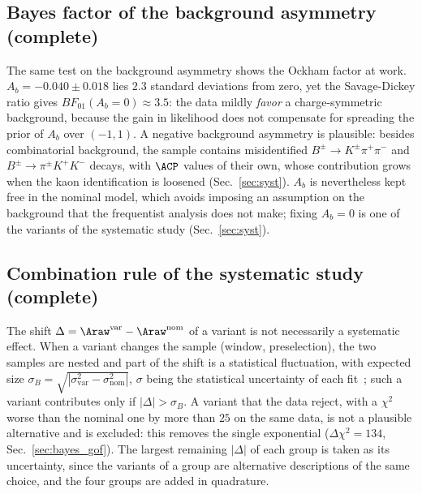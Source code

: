 \subsection{Bayes factor of the background asymmetry (complete)}
The same test on the background asymmetry shows the Ockham factor at work. $A_b=-0.040\pm0.018$ lies $2.3$ standard deviations from zero, yet the Savage-Dickey ratio gives $BF_{01}(A_b=0)\approx3.5$: the data mildly \emph{favor} a charge-symmetric background, because the gain in likelihood does not compensate for spreading the prior of $A_b$ over $(-1,1)$. A negative background asymmetry is plausible: besides combinatorial background, the sample contains misidentified $B^\pm\to K^\pm\pi^+\pi^-$ and $B^\pm\to\pi^\pm K^+K^-$ decays, with $\ACP$ values of their own, whose contribution grows when the kaon identification is loosened (Sec.~\ref{sec:syst}). $A_b$ is nevertheless kept free in the nominal model, which avoids imposing an assumption on the background that the frequentist analysis does not make; fixing $A_b=0$ is one of the variants of the systematic study (Sec.~\ref{sec:syst}).

\subsection{Combination rule of the systematic study (complete)}
The shift $\Delta=\Araw^{\mathrm{var}}-\Araw^{\mathrm{nom}}$ of a variant is not necessarily a systematic effect. When a variant changes the sample (window, preselection), the two samples are nested and part of the shift is a statistical fluctuation, with expected size $\sigma_B=\sqrt{|\sigma_{\mathrm{var}}^2-\sigma_{\mathrm{nom}}^2|}$, $\sigma$ being the statistical uncertainty of each fit~\cite{barlow}; such a variant contributes only if $|\Delta|>\sigma_B$. A variant that the data reject, with a $\chi^2$ worse than the nominal one by more than $25$ on the same data, is not a plausible alternative and is excluded: this removes the single exponential ($\Delta\chi^2=134$, Sec.~\ref{sec:bayes_gof}). The largest remaining $|\Delta|$ of each group is taken as its uncertainty, since the variants of a group are alternative descriptions of the same choice, and the four groups are added in quadrature.

